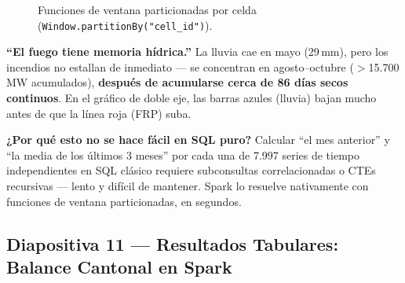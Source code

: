 \documentclass[11pt,a4paper]{article}
\begin{document}
\begin{figure}[H]
\centering
{}
\caption{Funciones de ventana particionadas por celda (\texttt{Window.partitionBy("cell\_id")}).}
\end{figure}

\begin{datobox}[title={Hallazgo central --- mem\'orizalo, es la conclusi\'on cient\'ifica del proyecto}]
\textbf{``El fuego tiene memoria h\'idrica.''} La lluvia cae en mayo (29\,mm), pero los incendios no estallan de inmediato --- se concentran en agosto--octubre ($>$15.700\,MW acumulados), \textbf{despu\'es de acumularse cerca de 86 d\'ias secos continuos}. En el gr\'afico de doble eje, las barras azules (lluvia) bajan mucho antes de que la l\'inea roja (FRP) suba.
\end{datobox}

\begin{alertabox}
\textbf{¿Por qu\'e esto no se hace f\'acil en SQL puro?} Calcular ``el mes anterior'' y ``la media de los \'ultimos 3 meses'' por cada una de 7.997 series de tiempo independientes en SQL cl\'asico requiere subconsultas correlacionadas o CTEs recursivas --- lento y dif\'icil de mantener. Spark lo resuelve nativamente con funciones de ventana particionadas, en segundos.
\end{alertabox}

\subsection{Diapositiva 11 --- Resultados Tabulares: Balance Cantonal en Spark}
\end{document}
